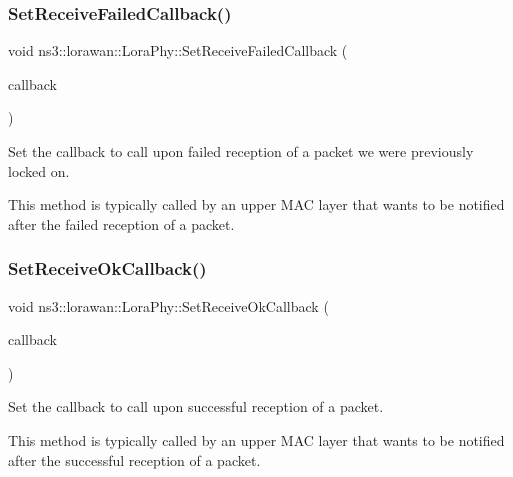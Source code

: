 \subsubsection{\texorpdfstring{Set\+Receive\+Failed\+Callback()}{SetReceiveFailedCallback()}}
{\footnotesize\ttfamily void ns3\+::lorawan\+::\+Lora\+Phy\+::\+Set\+Receive\+Failed\+Callback (\begin{DoxyParamCaption}\item[{\hyperlink{classns3_1_1lorawan_1_1LoraPhy_a2229a4841f407ee9931e563622edf663}{Rx\+Failed\+Callback}}]{callback }\end{DoxyParamCaption})}

Set the callback to call upon failed reception of a packet we were previously locked on.

This method is typically called by an upper M\+AC layer that wants to be notified after the failed reception of a packet. \mbox{\label{classns3_1_1lorawan_1_1LoraPhy_a2887a339fd5c66dc509a934d42f188c5}} 
\subsubsection{\texorpdfstring{Set\+Receive\+Ok\+Callback()}{SetReceiveOkCallback()}}
{\footnotesize\ttfamily void ns3\+::lorawan\+::\+Lora\+Phy\+::\+Set\+Receive\+Ok\+Callback (\begin{DoxyParamCaption}\item[{\hyperlink{classns3_1_1lorawan_1_1LoraPhy_ae9342f40d4eb2b1f004309f6fb444a50}{Rx\+Ok\+Callback}}]{callback }\end{DoxyParamCaption})}

Set the callback to call upon successful reception of a packet.

This method is typically called by an upper M\+AC layer that wants to be notified after the successful reception of a packet. \mbox{\label{classns3_1_1lorawan_1_1LoraPhy_aed62597e93fd17ccb4cb36d637a41728}} 

